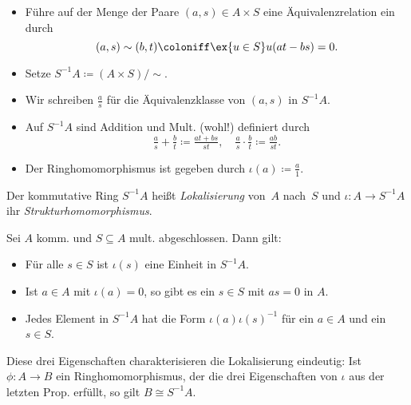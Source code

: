 \documentclass{cheat-sheet}
\begin{document}
\begin{konstr}
  \begin{itemize}
    \item Führe auf der Menge der Paare $(a, s) \in A \times S$ eine Äquivalenzrelation ein durch
    \[
      (a, s) \sim (b, t) \coloniff \ex{u \in S} u (at - bs) = 0.
    \]
    \item Setze $S^{-1} A \coloneqq (A \times S)/{\sim}$.
    \item Wir schreiben $\tfrac{a}{s}$ für die Äquivalenzklasse von $(a, s)$ in $S^{-1} A$.
    \item Auf $S^{-1} A$ sind  Addition und Mult. (wohl!) definiert durch
    \[
      \tfrac{a}{s} + \tfrac{b}{t} \coloneqq \tfrac{at + bs}{st}, \quad
      \tfrac{a}{s} \cdot \tfrac{b}{t} \coloneqq \tfrac{ab}{st}.
    \]
    \item Der Ringhomomorphismus ist gegeben durch $\iota(a) \coloneqq \tfrac{a}{1}$.
  \end{itemize}
\end{konstr}

\begin{defn}
  Der kommutative Ring $S^{-1} A$ heißt \emph{Lokalisierung} von~$A$ nach~$S$ und $\iota : A \to S^{-1} A$ ihr \textit{Strukturhomomorphismus}.
\end{defn}


\begin{prop}
  Sei $A$ komm. und $S \subseteq A$ mult. abgeschlossen.
  Dann gilt:
  \begin{itemize}
    \item Für alle $s \in S$ ist $\iota(s)$ eine Einheit in $S^{-1} A$.
    \item Ist $a \in A$ mit $\iota(a) = 0$, so gibt es ein $s \in S$ mit $as = 0$ in $A$.
    \item Jedes Element in $S^{-1} A$ hat die Form $\iota(a) \iota(s)^{-1}$ für ein $a \in A$ und ein $s \in S$.
  \end{itemize}
\end{prop}

\begin{bem}
  Diese drei Eigenschaften charakterisieren die Lokalisierung eindeutig:
  Ist $\phi : A \to B$ ein Ringhomomorphismus, der die drei Eigenschaften von $\iota$ aus der letzten Prop. erfüllt, so gilt $B \cong S^{-1} A$.
\end{bem}

\end{document}
